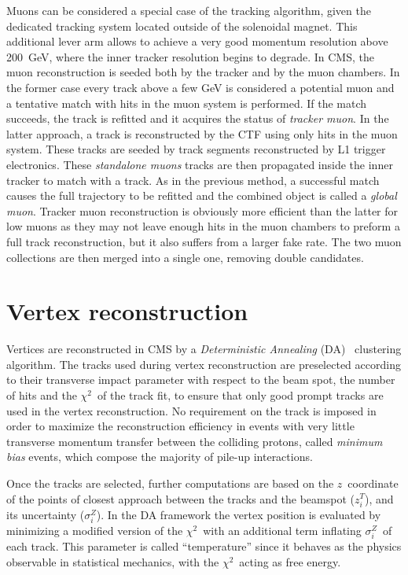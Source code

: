Muons can be considered a special case of the tracking algorithm, given the dedicated tracking system located outside of the solenoidal magnet. This additional lever arm allows to achieve a very good momentum resolution above 200~GeV, where the inner tracker resolution begins to degrade. 
In CMS, the muon reconstruction is seeded both by the tracker and by the muon chambers. In the former case every track above a few GeV is considered a potential muon and a tentative match with hits in the muon system is performed. If the match succeeds, the track is refitted and it acquires the status of \emph{tracker muon}. In the latter approach, a track is reconstructed by the CTF using only hits in the muon system. These tracks are seeded by track segments reconstructed by L1 trigger electronics. These \emph{standalone muons} tracks are then propagated inside the inner tracker to match with a track. As in the previous method, a successful match causes the full trajectory to be refitted and the combined object is called a \emph{global muon}. Tracker muon reconstruction is obviously more efficient than the latter for low \pT muons as they may not leave enough hits in the muon chambers to preform a full track reconstruction, but it also suffers from a larger fake rate. The two muon collections are then merged into a single one, removing double candidates.

\section{Vertex reconstruction}

Vertices are reconstructed in CMS by a \emph{Deterministic Annealing} (DA)~\cite{IEEE_DetAnnealing} clustering algorithm. The tracks used during vertex reconstruction are preselected according to their transverse impact parameter with respect to the beam spot, the number of hits and the $\chi^2$\ of the track fit, to ensure that only good prompt tracks are used in the vertex reconstruction. No requirement on the track \pT is imposed in order to maximize the reconstruction efficiency in events with very little transverse momentum transfer between the colliding protons, called \emph{minimum bias} events, which compose the majority of pile-up interactions.

Once the tracks are selected, further computations are based on the $z$\ coordinate of the points of closest approach between the tracks and the beamspot ($z_i^T$), and its uncertainty ($\sigma_i^Z$). In the DA framework the vertex position is evaluated by minimizing a modified version of the $\chi^2$\ with an additional term inflating $\sigma_i^Z$\ of each track. This parameter is called ``temperature'' since it behaves as the physics observable in statistical mechanics, with the  $\chi^2$\ acting as free energy.

